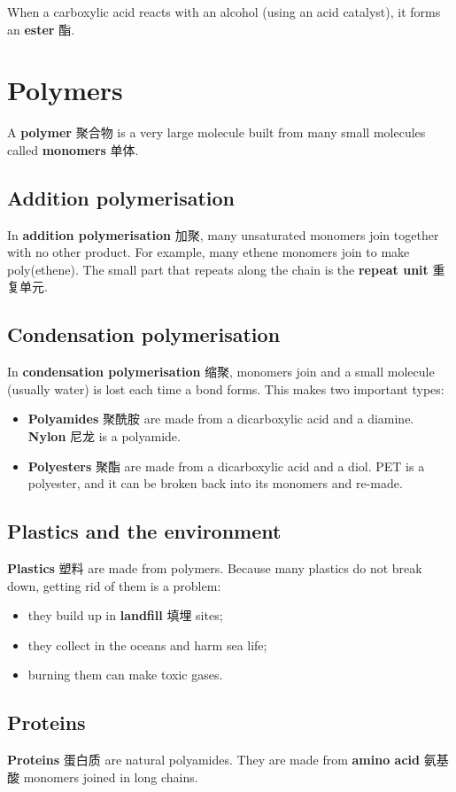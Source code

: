 \documentclass[11pt]{article}
\begin{document}
When a carboxylic acid reacts with an alcohol (using an acid catalyst), it forms an \textbf{ester} 酯.

\section*{Polymers}

A \textbf{polymer} 聚合物 is a very large molecule built from many small molecules called \textbf{monomers} 单体.

\subsection*{Addition polymerisation}

In \textbf{addition polymerisation} 加聚, many unsaturated monomers join together with no other product. For example, many ethene monomers join to make poly(ethene). The small part that repeats along the chain is the \textbf{repeat unit} 重复单元.

\subsection*{Condensation polymerisation}

In \textbf{condensation polymerisation} 缩聚, monomers join and a small molecule (usually water) is lost each time a bond forms. This makes two important types:

\begin{itemize}
\item \textbf{Polyamides} 聚酰胺 are made from a dicarboxylic acid and a diamine. \textbf{Nylon} 尼龙 is a polyamide.

\item \textbf{Polyesters} 聚酯 are made from a dicarboxylic acid and a diol. PET is a polyester, and it can be broken back into its monomers and re-made.

\end{itemize}

\subsection*{Plastics and the environment}

\textbf{Plastics} 塑料 are made from polymers. Because many plastics do not break down, getting rid of them is a problem:

\begin{itemize}
\item they build up in \textbf{landfill} 填埋 sites;

\item they collect in the oceans and harm sea life;

\item burning them can make toxic gases.

\end{itemize}

\subsection*{Proteins}

\textbf{Proteins} 蛋白质 are natural polyamides. They are made from \textbf{amino acid} 氨基酸 monomers joined in long chains.
\end{document}
